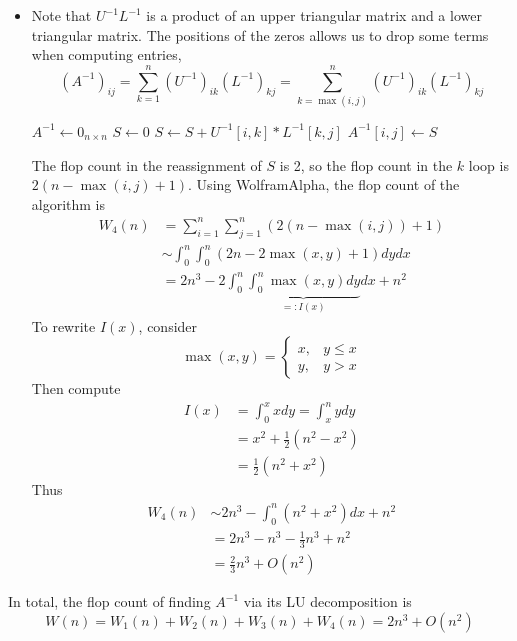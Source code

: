 \documentclass{article}
\newcommand{\inv}{^{-1}}
\begin{document}
\begin{enumerate}
\begin{enumerate}
\begin{itemize}
			
			
			\item Note that $U\inv L\inv$ is a product of an upper triangular matrix and a lower triangular matrix. The positions of the zeros allows us to drop some terms when computing entries, 
			\[(A\inv)_{ij} = \sum_{k=1}^n (U\inv)_{ik}(L\inv)_{kj}
			= \sum_{k=\max(i,j)}^n (U\inv)_{ik}(L\inv)_{kj}\]
			\begin{algorithmic}
				\State $A\inv \gets 0_{n\times n}$
						\State $S \gets 0$
							\State $S \gets S + U\inv[i,k]*L\inv[k,j]$
						\EndFor
						\State $A\inv[i,j] \gets S$
					\EndFor
				\EndFor
			\end{algorithmic}
			The flop count in the reassignment of $S$ is 2, so the flop count in the $k$ loop is $2(n-\max(i,j)+1)$. Using WolframAlpha, the flop count of the algorithm is
			\begin{align*}
				W_4(n) &= \sum_{i=1}^n\sum_{j=1}^n (2(n-\max(i,j)) + 1) \\
				&\sim \int_0^n\int_0^n(2n-2\max(x,y)+1)dydx \\
				&= 2n^3 - 2\int_0^n\underbrace{\int_0^n \max(x,y)dy}_{=:I(x)}dx + n^2
			\end{align*}
			To rewrite $I(x)$, consider
			\[\max(x,y) = 
			\begin{cases}
				x, & y\le x \\
				y, & y>x
			\end{cases}\]
			Then compute
			\begin{align*}
				I(x) &= \int_0^x xdy = \int_x^n ydy \\
				&= x^2 + \frac12(n^2-x^2) \\
				&= \frac12(n^2+x^2)
			\end{align*}
			Thus
			\begin{align*}
				W_4(n) &\sim 2n^3 - \int_0^n(n^2+x^2)dx + n^2 \\
				&= 2n^3 - n^3 - \frac13n^3 + n^2 \\
				&= \frac23n^3 + O(n^2)
			\end{align*}
		
		
			
		\end{itemize}
	
		In total, the flop count of finding $A\inv$ via its LU decomposition is
		\[W(n) = W_1(n) + W_2(n) + W_3(n) + W_4(n) = 2n^3 + O(n^2)\]
		
		
		

\end{enumerate}
\end{enumerate}
\end{document}

